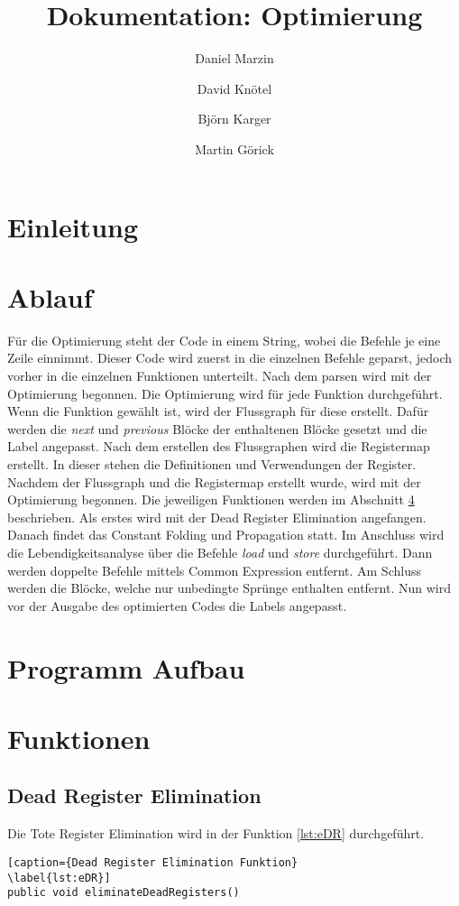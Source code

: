 \documentclass[a4paper]{article}
\title{Dokumentation: Optimierung}
\author{Daniel Marzin \and David Knötel \and Björn Karger \and Martin Görick}
\date{}
\begin{document}
\maketitle
\section{Einleitung}


\section{Ablauf}
Für die Optimierung steht der Code in einem String, wobei die Befehle je eine Zeile einnimmt.
Dieser Code wird zuerst in die einzelnen Befehle geparst, jedoch vorher in die einzelnen Funktionen unterteilt.
Nach dem parsen wird mit der Optimierung begonnen. \newline
Die Optimierung wird für jede Funktion durchgeführt.
Wenn die Funktion gewählt ist, wird der Flussgraph für diese erstellt.
Dafür werden die \textit{next} und \textit{previous} Blöcke der enthaltenen Blöcke gesetzt und die Label angepasst.
Nach dem erstellen des Flussgraphen wird die Registermap erstellt.
In dieser stehen die Definitionen und Verwendungen der Register.
Nachdem der Flussgraph und die Registermap erstellt wurde, wird mit der Optimierung begonnen.
Die jeweiligen Funktionen werden im Abschnitt \ref{ab:funk} beschrieben.
Als erstes wird mit der Dead Register Elimination angefangen.
Danach findet das Constant Folding und Propagation statt.
Im Anschluss wird die Lebendigkeitsanalyse über die Befehle \textit{load} und \textit{store} durchgeführt.
Dann werden doppelte Befehle mittels Common Expression entfernt.
Am Schluss werden die Blöcke, welche nur unbedingte Sprünge enthalten entfernt.
Nun wird vor der Ausgabe des optimierten Codes die Labels angepasst.

\section{Programm Aufbau}

\section{Funktionen}
\label{ab:funk}
\subsection{Dead Register Elimination}
Die Tote Register Elimination wird in der Funktion \ref{lst:eDR} durchgeführt.
\begin{lstlisting}[caption={Dead Register Elimination Funktion}
\label{lst:eDR}]
public void eliminateDeadRegisters()
\end{lstlisting}
\end{document}
